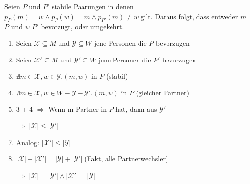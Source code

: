\begin{frame}
  \begin{Lemma}
  \label{strikte_ordnung}
    Seien $P$ und $P'$ stabile Paarungen in denen $p_{P}(m) = w \land p_{P}(w) = m \land p_{P'}(m) \neq w$ gilt. Daraus folgt, dass entweder $m$ $P$ und $w$ $P'$ bevorzugt, oder umgekehrt.
  \end{Lemma}

  \begin{Beweis}
  \label{strikte_ordnung_bew}
    \begin{enumerate}[<+->]
        \item Seien $\mathcal{X} \subseteq M$ und $\mathcal{Y} \subseteq W$ jene Personen die $P$ bevorzugen
        \item Seien $\mathcal{X'} \subseteq M$ und $\mathcal{Y'} \subseteq W$ jene Personen die $P'$ bevorzugen
        \item $\nexists m \in \mathcal{X},w \in \mathcal{Y}. (m,w) \textrm{ in } P$ (stabil)
        \item $\nexists m \in \mathcal{X},w \in W - \mathcal{Y} - \mathcal{Y'}. (m,w) \textrm{ in } P$ (gleicher Partner)
        \item 3 + 4 $\Longrightarrow$ Wenn m Partner in $P$ hat, dann aus $\mathcal{Y'}$
        \item[$\Longrightarrow$] $|\mathcal{X}| \leq |\mathcal{Y'}|$
        \item Analog: $|\mathcal{X'}| \leq |\mathcal{Y}|$
        \item $|\mathcal{X}| + |\mathcal{X'}| = |\mathcal{Y}| + |\mathcal{Y'}|$ (Fakt, alle Partnerwechsler)
        \item[$\Longrightarrow$] $|\mathcal{X}| = |\mathcal{Y'}|\land |\mathcal{X'}| = |\mathcal{Y}|$
    \end{enumerate}
  \end{Beweis}
\end{frame}

